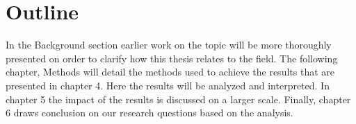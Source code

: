 \section{Outline}

In the Background section earlier work on the topic will be more thoroughly presented on order to clarify how this thesis relates to the field. The following chapter, Methods will detail the methods used to achieve the results that are presented in chapter 4. Here the results will be analyzed and interpreted. In chapter 5 the impact of the results is discussed on a larger scale. Finally, chapter 6 draws conclusion on our research questions based on the analysis.
